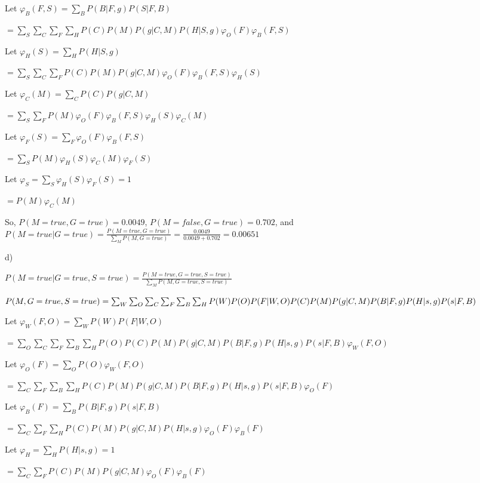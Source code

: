 \documentclass[12pt]{article}
\begin{document}
Let $\varphi_B(F, S) = \sum_B P(B \vert F, g)P(S \vert F, B)$

$= \sum_S\sum_C\sum_F\sum_H P(C)P(M)P(g \vert C, M)P(H \vert S, g)\varphi_O(F)\varphi_B(F, S)$

Let $\varphi_H(S) = \sum_H P(H \vert S, g)$

$= \sum_S\sum_C\sum_F P(C)P(M)P(g \vert C, M)\varphi_O(F)\varphi_B(F, S)\varphi_H(S)$

Let $\varphi_C(M) = \sum_C P(C)P(g \vert C, M)$

$= \sum_S\sum_F P(M)\varphi_O(F)\varphi_B(F, S)\varphi_H(S)\varphi_C(M)$

Let $\varphi_F(S) = \sum_F \varphi_O(F)\varphi_B(F, S)$

$= \sum_S P(M)\varphi_H(S)\varphi_C(M)\varphi_F(S)$

Let $\varphi_S = \sum_S \varphi_H(S)\varphi_F(S) = 1$

$= P(M)\varphi_C(M)$

So, $P(M = true, G = true) = 0.0049$, $P(M = false, G = true) = 0.702$, and $P(M = true \vert G = true) = \frac{P(M = true, G = true)}{\sum_M P(M, G = true)} = \frac{0.0049}{0.0049 + 0.702} = \mathbf{0.00651}$

d) 

$P(M = true \vert G = true, S = true) = \frac{P(M = true, G = true, S = true)}{\sum_M P(M, G = true, S = true)}$

$P(M, G = true, S = true) = \sum_W\sum_O\sum_C\sum_F\sum_B\sum_H P(W)P(O)P(F\vert W, O)P(C)P(M)P(g \vert C, M)\\P(B \vert F, g)P(H \vert s, g)P(s \vert F, B)$

Let $\varphi_W(F, O) = \sum_W P(W)P(F \vert W, O)$

$= \sum_O\sum_C\sum_F\sum_B\sum_H P(O)P(C)P(M)P(g \vert C, M)P(B \vert F, g)P(H \vert s, g)P(s \vert F, B)\varphi_W(F, O)$

Let $\varphi_O(F) = \sum_O P(O)\varphi_W(F, O)$

$= \sum_C\sum_F\sum_B\sum_H P(C)P(M)P(g \vert C, M)P(B \vert F, g)P(H \vert s, g)P(s \vert F, B)\varphi_O(F)$

Let $\varphi_B(F) = \sum_B P(B \vert F, g)P(s \vert F, B)$

$= \sum_C\sum_F\sum_H P(C)P(M)P(g \vert C, M)P(H \vert s, g)\varphi_O(F)\varphi_B(F)$

Let $\varphi_H = \sum_H P(H \vert s, g) = 1$

$= \sum_C\sum_F P(C)P(M)P(g \vert C, M)\varphi_O(F)\varphi_B(F)$
\end{document}
